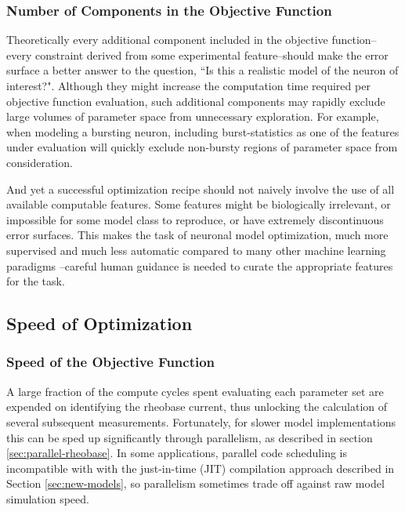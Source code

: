 \subsubsection{Number of Components in the Objective Function}
Theoretically every additional component included in the objective function--every constraint derived from some experimental feature--should make the error surface a better answer to the question, ``Is this a realistic model of the neuron of interest?".
Although they might increase the computation time required per objective function evaluation, such additional components may rapidly exclude large volumes of parameter space from unnecessary exploration.
For example, when modeling a bursting neuron, including burst-statistics as one of the features under evaluation will quickly exclude non-bursty regions of parameter space from consideration.

And yet a successful optimization recipe should not naively involve the use of all available computable features.
Some features might be biologically irrelevant, or impossible for some model class to reproduce, or have extremely discontinuous error surfaces. 
This makes the task of neuronal model optimization, much more supervised and much less automatic compared to many other machine learning paradigms --careful human guidance is needed to curate the appropriate features for the task. 

\subsection{Speed of Optimization}
\subsubsection{Speed of the Objective Function}
A large fraction of the compute cycles spent evaluating each parameter set are expended on identifying the rheobase current, thus unlocking the calculation of several subsequent measurements.
Fortunately, for slower model implementations this can be sped up significantly through parallelism, as described in section \ref{sec:parallel-rheobase}.
In some applications, parallel code scheduling is incompatible with with the just-in-time (JIT) compilation approach described in Section \ref{sec:new-models}, so parallelism sometimes trade off against raw model simulation speed. 

